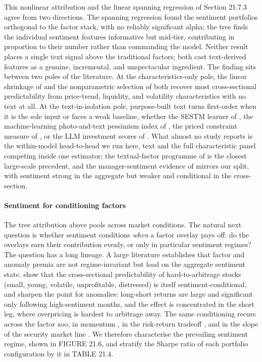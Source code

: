 This nonlinear attribution and the linear spanning regression of Section 21.7.3 agree from two directions. The spanning regression found the sentiment portfolios orthogonal to the factor stack, with no reliably significant alpha; the tree finds the individual sentiment features informative but mid-tier, contributing in proportion to their number rather than commanding the model. Neither result places a single text signal above the traditional factors; both cast text-derived features as a genuine, incremental, and unspectacular ingredient. The finding sits between two poles of the literature. At the characteristics-only pole, the linear shrinkage of \cite{kozak2019shrinking} and the nonparametric selection of \cite{freyberger2020dissecting} both recover most cross-sectional predictability from price-trend, liquidity, and volatility characteristics with no text at all. At the text-in-isolation pole, purpose-built text turns first-order when it is the sole input or faces a weak baseline, whether the SESTM learner of \cite{ke2019predicting}, the machine-learning photo-and-text pessimism index of \cite{obaid2022picture}, the priced constraint measure of \cite{buehlmaier2018financial}, or the LLM investment scores of \cite{jha2024chatgpt}. What almost no study reports is the within-model head-to-head we run here, text and the full characteristic panel competing inside one estimator; the textual-factor programme of \cite{cong2019textual} is the closest large-scale precedent, and the manager-sentiment evidence of \cite{jiang2019manager} mirrors our split, with sentiment strong in the aggregate but weaker and conditional in the cross-section.

\paragraph{Sentiment for conditioning factors}

The tree attribution above pools across market conditions. The natural next question is whether sentiment conditions \textit{when} a factor overlay pays off: do the overlays earn their contribution evenly, or only in particular sentiment regimes? The question has a long lineage. A large literature establishes that factor and anomaly premia are not regime-invariant but load on the aggregate sentiment state. \cite{baker2006investor} show that the cross-sectional predictability of hard-to-arbitrage stocks (small, young, volatile, unprofitable, distressed) is itself sentiment-conditional, and \cite{stambaugh2012short} sharpen the point for anomalies: long-short returns are large and significant only following high-sentiment months, and the effect is concentrated in the short leg, where overpricing is hardest to arbitrage away. The same conditioning recurs across the factor zoo, in momentum \citep{antoniou2013cognitive}, in the risk-return tradeoff \citep{yuyuan2011investor}, and in the slope of the security market line \citep{antoniou2016investor}. We therefore characterise the prevailing sentiment regime, shown in FIGURE 21.6, and stratify the Sharpe ratio of each portfolio configuration by it in TABLE 21.4.

